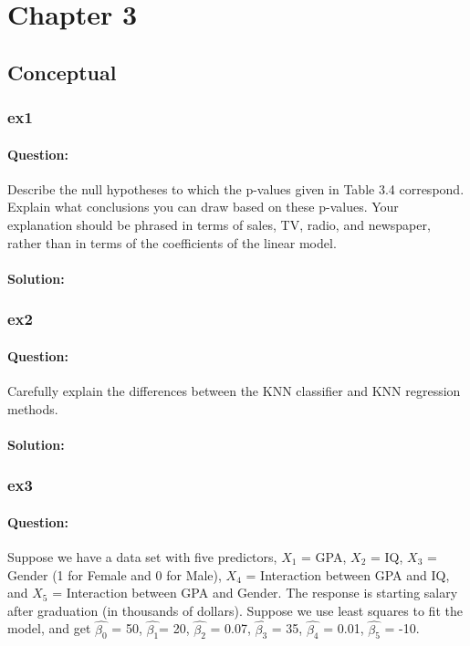 \documentclass[a4paper,12pt,titlepage]{article} %
\begin{document}
\section{Chapter 3}
\subsection{Conceptual}
\subsubsection{ex1}
\paragraph{Question:} Describe the null hypotheses to which the p-values given in Table 3.4 correspond. Explain what conclusions you can draw based on these p-values. Your explanation should be phrased in terms of sales, TV, radio, and newspaper, rather than in terms of the coefficients of the
linear model.

\paragraph{Solution:}

\subsubsection{ex2}
\paragraph{Question:} Carefully explain the differences between the KNN classifier and KNN
regression methods.

\paragraph{Solution:}

\subsubsection{ex3}
\paragraph{Question:} Suppose we have a data set with five predictors, $X_{1}$ = GPA, $X_{2}$ = IQ, $X_{3}$ = Gender (1 for Female and 0 for Male), $X_{4}$ = Interaction between GPA and IQ, and $X_{5}$ = Interaction between GPA and Gender. The response is starting salary after graduation (in thousands of dollars). Suppose we use least squares to fit the model, and get $\hat{\beta_{0}}$ = 50, $\hat{\beta_{1}}$= 20, $\hat{\beta_{2}}$ = 0.07, $\hat{\beta_{3}}$ = 35, $\hat{\beta_{4}}$ = 0.01, $\hat{\beta_{5}}$ = -10.
\end{document}
